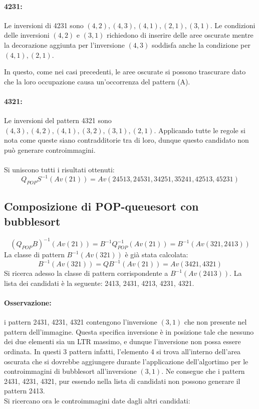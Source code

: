 \paragraph*{4231:} Le inversioni di 4231 sono $(4,2),(4,3),(4,1),(2,1),(3,1)$. Le condizioni delle inversioni $(4,2)$ e $(3,1)$ richiedono di inserire delle aree oscurate mentre la decorazione aggiunta per l'inversione $(4,3)$ soddisfa anche la condizione per $(4,1),(2,1)$.
\begin{center}
\end{center}
In questo, come nei casi precedenti, le aree oscurate si possono trascurare dato che la loro occupazione causa un'occorrenza del pattern (A).
\paragraph*{4321:} Le inversioni del pattern 4321 sono $(4,3),(4,2),(4,1),(3,2),(3,1),(2,1)$. Applicando tutte le regole si nota come queste siano contradditorie tra di loro, dunque questo candidato non pu\`o generare controimmagini.
\\\\Si uniscono tutti i risultati ottenuti:
$$Q_{POP}S^{-1}(Av(21)) = Av(24513, 24531, 34251, 35241, 42513, 45231)$$
\subsection{Composizione di {POP-queuesort} con {bubblesort}}
$$(Q_{POP}{B})^{-1}(Av(21)) = B^{-1}Q_{POP}^{-1}(Av(21))=B^{-1}(Av(321,2413))$$
La classe di pattern $B^{-1}(Av(321))$ \`e gi\`a stata calcolata:
$$B^{-1}(Av(321)) = QB^{-1}(Av(21)) = Av(3421, 4321)$$
Si ricerca adesso la classe di pattern corrispondente a $B^{-1}(Av(2413))$. La lista dei candidati \`e la seguente: 2413, 2431, 4213, 4231, 4321.
\paragraph*{Osservazione:} i pattern 2431, 4231, 4321 contengono l'inversione $(3,1)$ che non presente nel pattern dell'immagine. Questa specifica inversione \`e in posizione tale che nessuno dei due elementi sia un LTR massimo, e dunque l'inversione non possa essere ordinata. In questi 3 pattern infatti, l'elemento 4 si trova all'interno dell'area oscurata che si dovrebbe aggiungere durante l'applicazione dell'algortimo per le controimmagini di bubblesort all'inversione $(3,1)$. Ne consegue che i pattern  2431, 4231, 4321, pur essendo nella lista di candidati non possono generare il pattern 2413.\\
Si ricercano ora le controimmagini date dagli altri candidati:
